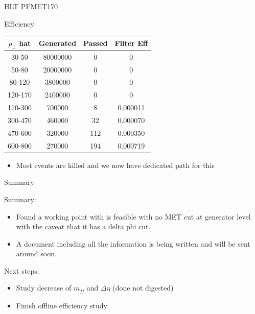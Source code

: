 \documentclass[8pt]{beamer}
\begin{document}
\begin{frame}{HLT PFMET170}

\begin{block}{Efficiency}

\centering
\begin{tabular}{|c||c|c|c|}
\hline
$p_\perp$ hat & Generated & Passed & Filter Eff  \\
\hline
\hline                                   
  30-50 &   80000000    &   0 & 0        \\
  50-80 &   20000000    &   0 & 0        \\
 80-120 &      3800000  &   0 & 0        \\
120-170 & 2400000       &   0 & 0        \\
170-300 &  700000       &   8 & 0.000011 \\
300-470 &   460000      &  32 & 0.000070 \\
470-600 &   320000      & 112 & 0.000350 \\
600-800 &      270000   & 194 & 0.000719 \\
\hline
\hline
\end{tabular}

\end{block}
  
\begin{itemize}
  \item Most events are killed and we now have dedicated path for this
\end{itemize}
  
\end{frame}


\begin{frame}{Summary}
 
\begin{block}{Summary:}
 
\begin{itemize}
  \item Found a working point with is feasible with no MET cut at generator level with the caveat that it has a delta phi cut.
  \item A document including all the information is being written and will be sent around soon.
\end{itemize}

\end{block}

\begin{block}{Next steps:}
 
\begin{itemize}
  \item Study decrease of $m_{jj}$ and $\Delta\eta$ (done not digested)
  \item Finish offline efficiency study
\end{itemize}

\end{block}

\end{frame}
\end{document}
